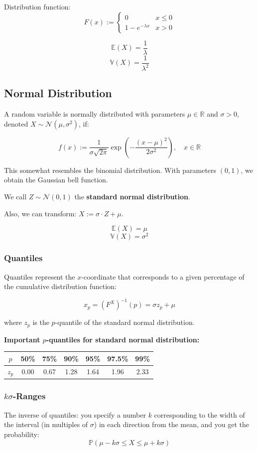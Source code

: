 \documentclass{article}
\begin{document}
Distribution function:
\[F(x) := \begin{cases}
    0 & x \leq 0 \\
    1 - e^{-\lambda x} & x > 0 
\end{cases}\]

\[\mathbb{E}(X) = \frac{1}{\lambda}\]
\[\mathbb{V}(X) = \frac{1}{\lambda^2}\]

\subsection{Normal Distribution}
A random variable is normally distributed with parameters $\mu \in \mathbb{R}$ and $\sigma > 0$, denoted $X \sim \mathcal{N}(\mu,\sigma^2)$, if:

\[f(x) := \frac{1}{\sigma\sqrt{2\pi}} \exp\left(-\frac{(x-\mu)^2}{2\sigma^2}\right), \quad x\in \mathbb{R}\]

This somewhat resembles the binomial distribution. With parameters $(0,1)$, we obtain the Gaussian bell function.

We call $Z \sim \mathcal{N}(0,1)$ the \textbf{standard normal distribution}.

Also, we can transform: $X := \sigma \cdot Z + \mu$.

\[\mathbb{E}(X) = \mu\]
\[\mathbb{V}(X) = \sigma^2\]

\subsubsection{Quantiles}
Quantiles represent the $x$-coordinate that corresponds to a given percentage of the cumulative distribution function:

\[x_p = (F^X)^{-1}(p) = \sigma z_p + \mu\]

where $z_p$ is the $p$-quantile of the standard normal distribution.

\vspace{0.5em}
\noindent\textbf{Important $p$-quantiles for standard normal distribution:}

\begin{center}
\begin{tabular}{|c|c|c|c|c|c|c|}
    \hline
    $p$ & 50\% & 75\% & 90\% & 95\% & 97.5\% & 99\%\\
    \hline
    $z_p$ & 0.00 & 0.67 & 1.28 & 1.64 & 1.96 & 2.33\\ 
    \hline
\end{tabular}
\end{center}

\subsubsection{$k\sigma$-Ranges}
The inverse of quantiles: you specify a number $k$ corresponding to the width of the interval (in multiples of $\sigma$) in each direction from the mean, and you get the probability:
\[\mathbb{P}(\mu - k\sigma \leq X \leq \mu + k\sigma)\]
\end{document}
